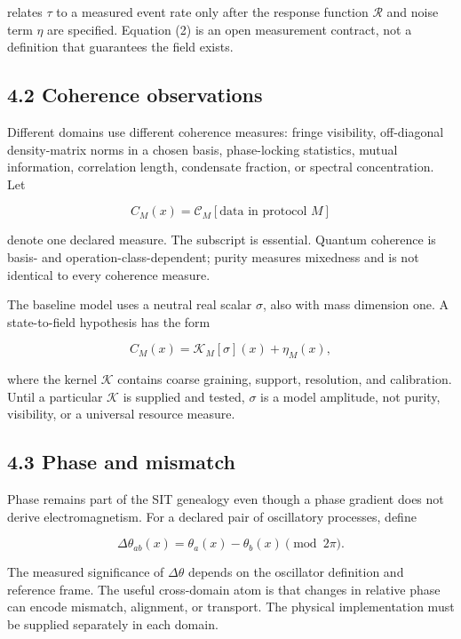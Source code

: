 \documentclass[
  american,
  11pt,
  letterpaper,
]{article}
\begin{document}
relates \(\tau\) to a measured event rate only after the response function \(\mathcal R\) and noise term \(\eta\) are specified. Equation (2) is an open measurement contract, not a definition that guarantees the field exists.

\subsection{4.2 Coherence observations}\label{coherence-observations}

Different domains use different coherence measures: fringe visibility, off-diagonal density-matrix norms in a chosen basis, phase-locking statistics, mutual information, correlation length, condensate fraction, or spectral concentration. Let

\begin{equation}
C_M(x)=\mathcal{C}_M[\text{data in protocol }M]
\tag{3}
\end{equation}

denote one declared measure. The subscript is essential. Quantum coherence is basis- and operation-class-dependent; purity measures mixedness and is not identical to every coherence measure.

The baseline model uses a neutral real scalar \(\sigma\), also with mass dimension one. A state-to-field hypothesis has the form

\begin{equation}
C_M(x)=\mathcal{K}_M[\sigma](x)+\eta_M(x),
\tag{4}
\end{equation}

where the kernel \(\mathcal K\) contains coarse graining, support, resolution, and calibration. Until a particular \(\mathcal K\) is supplied and tested, \(\sigma\) is a model amplitude, not purity, visibility, or a universal resource measure.

\subsection{4.3 Phase and mismatch}\label{phase-and-mismatch}

Phase remains part of the SIT genealogy even though a phase gradient does not derive electromagnetism. For a declared pair of oscillatory processes, define

\begin{equation}
\Delta\theta_{ab}(x)=\theta_a(x)-\theta_b(x)\pmod{2\pi}.
\tag{5}
\end{equation}

The measured significance of \(\Delta\theta\) depends on the oscillator definition and reference frame. The useful cross-domain atom is that changes in relative phase can encode mismatch, alignment, or transport. The physical implementation must be supplied separately in each domain.
\end{document}
